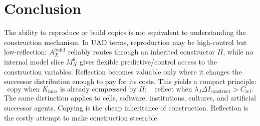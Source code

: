 \documentclass[11pt]{article}
\begin{document}
\section{Conclusion}

The ability to reproduce or build copies is not equivalent to understanding the construction mechanism. In UAD terms, reproduction may be high-control but low-reflection: $A_X^{\mathrm{build}}$ reliably routes through an inherited constructor $\Pi$, while no internal model slice $M_X^\theta$ gives flexible predictive/control access to the construction variables. Reflection becomes valuable only where it changes the successor distribution enough to pay for its costs. This yields a compact principle:
\begin{equation}
  \boxed{
  \text{copy when }K_{\mathrm{miss}}\text{ is already compressed by }\Pi;
  \quad
  \text{reflect when }\lambda_J\Delta I_{\mathrm{construct}}>C_{\mathrm{ref}}.
  }
\end{equation}
The same distinction applies to cells, software, institutions, cultures, and artificial successor agents. Copying is the cheap inheritance of construction. Reflection is the costly attempt to make construction steerable.
\end{document}
